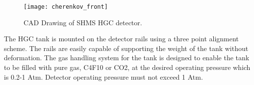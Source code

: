 % 
% 
% 
% 
% 
% 
% 








\begin{figure}[ht]
\centering
\texttt{[image: cherenkov\_front]}
\caption{CAD Drawing of SHMS HGC detector. \label{fig:hgc}}
\end{figure}



The HGC tank is mounted on the detector rails using a three point
alignment scheme. The rails are easily capable of supporting the
weight of the tank without deformation. The gas handling system for
the tank is designed to enable the tank to be filled with pure gas,
C4F10 or CO2, at the desired operating pressure which is 0.2-1
Atm. Detector operating pressure must not exceed 1 Atm.


